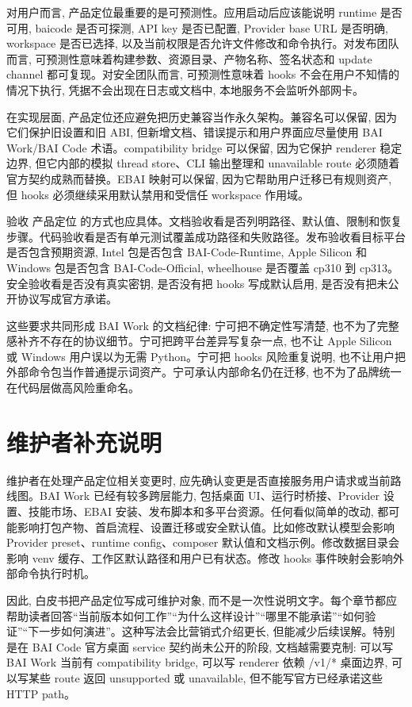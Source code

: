 对用户而言, 产品定位最重要的是可预测性。应用启动后应该能说明 runtime 是否可用, baicode 是否可探测, API key 是否已配置, Provider base URL 是否明确, workspace 是否已选择, 以及当前权限是否允许文件修改和命令执行。对发布团队而言, 可预测性意味着构建参数、资源目录、产物名称、签名状态和 update channel 都可复现。对安全团队而言, 可预测性意味着 hooks 不会在用户不知情的情况下执行, 凭据不会出现在日志或文档中, 本地服务不会监听外部网卡。

在实现层面, 产品定位还应避免把历史兼容当作永久架构。兼容名可以保留, 因为它们保护旧设置和旧 ABI, 但新增文档、错误提示和用户界面应尽量使用 BAI Work/BAI Code 术语。compatibility bridge 可以保留, 因为它保护 renderer 稳定边界, 但它内部的模拟 thread store、CLI 输出整理和 unavailable route 必须随着官方契约成熟而替换。EBAI 映射可以保留, 因为它帮助用户迁移已有规则资产, 但 hooks 必须继续采用默认禁用和受信任 workspace 作用域。

验收 产品定位 的方式也应具体。文档验收看是否列明路径、默认值、限制和恢复步骤。代码验收看是否有单元测试覆盖成功路径和失败路径。发布验收看目标平台是否包含预期资源, Intel 包是否包含 BAI-Code-Runtime, Apple Silicon 和 Windows 包是否包含 BAI-Code-Official, wheelhouse 是否覆盖 cp310 到 cp313。安全验收看是否没有真实密钥, 是否没有把 hooks 写成默认启用, 是否没有把未公开协议写成官方承诺。

这些要求共同形成 BAI Work 的文档纪律: 宁可把不确定性写清楚, 也不为了完整感补齐不存在的协议细节。宁可把跨平台差异写复杂一点, 也不让 Apple Silicon 或 Windows 用户误以为无需 Python。宁可把 hooks 风险重复说明, 也不让用户把外部命令包当作普通提示词资产。宁可承认内部命名仍在迁移, 也不为了品牌统一在代码层做高风险重命名。

\section{维护者补充说明}

维护者在处理产品定位相关变更时, 应先确认变更是否直接服务用户请求或当前路线图。BAI Work 已经有较多跨层能力, 包括桌面 UI、运行时桥接、Provider 设置、技能市场、EBAI 安装、发布脚本和多平台资源。任何看似简单的改动, 都可能影响打包产物、首启流程、设置迁移或安全默认值。比如修改默认模型会影响 Provider preset、runtime config、composer 默认值和文档示例。修改数据目录会影响 venv 缓存、工作区默认路径和用户已有状态。修改 hooks 事件映射会影响外部命令执行时机。

因此, 白皮书把产品定位写成可维护对象, 而不是一次性说明文字。每个章节都应帮助读者回答“当前版本如何工作”“为什么这样设计”“哪里不能承诺”“如何验证”“下一步如何演进”。这种写法会比营销式介绍更长, 但能减少后续误解。特别是在 BAI Code 官方桌面 service 契约尚未公开的阶段, 文档越需要克制: 可以写 BAI Work 当前有 compatibility bridge, 可以写 renderer 依赖 /v1/* 桌面边界, 可以写某些 route 返回 unsupported 或 unavailable, 但不能写官方已经承诺这些 HTTP path。

